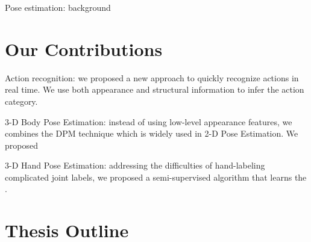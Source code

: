 Pose estimation: background 

\section{Our Contributions}

Action recognition: we proposed a new approach to quickly recognize actions in real time. We use both appearance and structural information to infer the action category. 

3-D Body Pose Estimation: instead of using low-level appearance features, we combines the DPM technique which is widely used in 2-D Pose Estimation. We proposed 

3-D Hand Pose Estimation: addressing the difficulties of hand-labeling complicated joint labels, we proposed a semi-supervised algorithm that learns the .

\section{Thesis Outline} 
